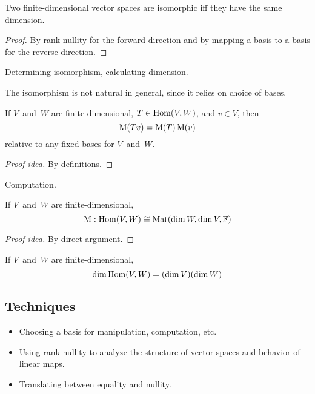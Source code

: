\begin{thm}
Two finite-dimensional vector spaces are isomorphic iff they have the same dimension.
\end{thm}
\begin{proof}
By rank nullity for the forward direction and by mapping a basis to a basis for the reverse direction.
\end{proof}
\begin{app}
Determining isomorphism, calculating dimension.
\end{app}
\begin{rmk}
The isomorphism is not natural in general, since it relies on choice of bases.
\end{rmk}

\begin{thm}[Matrices]
If \(V\)~and~\(W\) are finite-dimensional, \(T\in\operatorname{Hom}(V,W)\), and \(v\in V\), then
\[\operatorname{M}(Tv)=\operatorname{M}(T)\operatorname{M}(v)\]
relative to any fixed bases for \(V\)~and~\(W\).
\end{thm}
\begin{proof}[Proof idea]
By definitions.
\end{proof}
\begin{app}
Computation.
\end{app}

\begin{thm}
If \(V\)~and~\(W\) are finite-dimensional,
\[\operatorname{M}:\operatorname{Hom}(V,W)\cong\operatorname{Mat}(\dim W,\dim V,\mathbb{F})\]
\end{thm}
\begin{proof}[Proof idea]
By direct argument.
\end{proof}
\begin{cor}
If \(V\)~and~\(W\) are finite-dimensional,
\[\dim\operatorname{Hom}(V,W)=(\dim V)(\dim W)\]
\end{cor}

\subsection*{Techniques}
\begin{itemize}[itemsep=0pt]
\item Choosing a basis for manipulation, computation, etc.
\item Using rank nullity to analyze the structure of vector spaces and behavior of linear maps.
\item Translating between equality and nullity.
\end{itemize}
